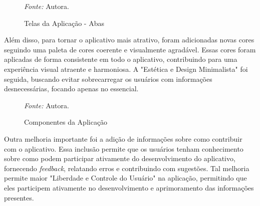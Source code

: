 \begin{figure}[h!]
	\centering
	\caption{Telas da Aplicação - Abas}
	\begin{tablenotes}[flushleft]
		\centering
		\item \textit{Fonte:} Autora.
	\end{tablenotes}
	\label{fig24}
\end{figure}

Além disso, para tornar o aplicativo mais atrativo, foram adicionadas novas cores seguindo uma paleta de cores coerente e visualmente agradável. Essas cores foram aplicadas de forma consistente em todo o aplicativo, 
contribuindo para uma experiência visual atraente e harmoniosa. A "Estética e Design Minimalista" foi seguida, buscando evitar sobrecarregar os usuários com informações desnecessárias, focando apenas no essencial.

\begin{figure}[h!]
	\centering
	\caption{Componentes da Aplicação}
	\begin{tablenotes}[flushleft]
		\centering
		\item \textit{Fonte:} Autora.
	\end{tablenotes}
	\label{fig25}
\end{figure}

Outra melhoria importante foi a adição de informações sobre como contribuir com o aplicativo. Essa inclusão permite que os usuários tenham conhecimento sobre como podem participar ativamente do desenvolvimento do aplicativo, 
fornecendo \textit{feedback}, relatando erros e contribuindo com sugestões. Tal melhoria permite maior "Liberdade e Controle do Usuário" na aplicação, permitindo que eles participem ativamente no desenvolvimento e aprimoramento 
das informações presentes.

